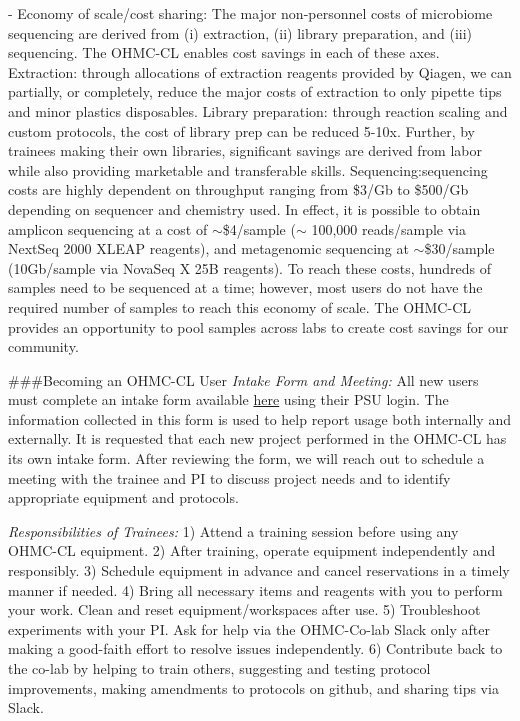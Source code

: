 \documentclass[
]{book}
\begin{document}
- Economy of scale/cost sharing: The major non-personnel costs of microbiome sequencing are
derived from (i) extraction, (ii) library preparation, and (iii) sequencing. The OHMC-CL enables cost savings in each of these axes. Extraction: through allocations of extraction reagents provided by Qiagen, we can partially, or completely, reduce the major costs of extraction to only pipette tips and minor plastics disposables. Library preparation: through reaction scaling and custom protocols, the cost of library prep can be reduced 5-10x. Further, by trainees making their own libraries, significant savings are derived from labor while also providing marketable and transferable skills. Sequencing:sequencing costs are highly dependent on throughput ranging from \$3/Gb to \$500/Gb depending on
sequencer and chemistry used. In effect, it is possible to obtain amplicon sequencing at a cost of \(\sim\)\$4/sample (\(\sim\) 100,000 reads/sample via NextSeq 2000 XLEAP reagents), and metagenomic
sequencing at \(\sim\)\$30/sample (10Gb/sample via NovaSeq X 25B reagents). To reach these costs,
hundreds of samples need to be sequenced at a time; however, most users do not have the required number of samples to reach this economy of scale. The OHMC-CL provides an opportunity to pool samples across labs to create cost savings for our community.

\#\#\#Becoming an OHMC-CL User
\emph{Intake Form and Meeting:} All new users must complete an intake form available \href{https://docs.google.com/forms/d/e/1FAIpQLSffei_1Tbnz93hO3syqv_qpWeaec29JRwlvIQKdmADdvBZdrQ/viewform}{here} using their PSU login. The information collected in this form is used to help report usage both internally and externally. It is requested that each new project performed in the OHMC-CL has its own intake form. After reviewing the form, we will reach out to schedule a meeting with the trainee and PI to discuss project needs and to identify appropriate equipment and protocols.

\emph{Responsibilities of Trainees:}
1) Attend a training session before using any OHMC-CL equipment.
2) After training, operate equipment independently and responsibly.
3) Schedule equipment in advance and cancel reservations in a timely manner if needed.
4) Bring all necessary items and reagents with you to perform your work. Clean and reset
equipment/workspaces after use.
5) Troubleshoot experiments with your PI. Ask for help via the OHMC-Co-lab Slack only after making
a good-faith effort to resolve issues independently.
6) Contribute back to the co-lab by helping to train others, suggesting and testing protocol
improvements, making amendments to protocols on github, and sharing tips via Slack.
\end{document}
